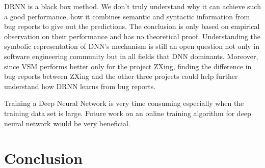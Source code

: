 DRNN is a black box method. 
We don't truly understand why it can achieve such a good performance, how it combines semantic and syntactic information from bug reports to give out the predictions.
The conclusion is only based on empirical observation on their performance and has no theoretical proof.
Understanding the symbolic representation of DNN's mechanism is still an open question not only in software engineering community but in all fields that DNN dominants.   
Moreover, since VSM performs better only for the project ZXing, finding the difference in bug reports between ZXing and the other three projects could help further understand how DRNN learns from bug reports. 

Training a Deep Neural Network is very time consuming especially when the training data set is large. 
Future work on an online training algorithm for deep neural network would be very beneficial.

\section{Conclusion}







	 
